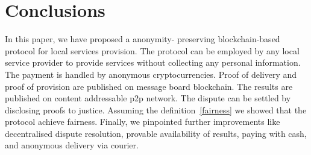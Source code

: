 \documentclass{ieeeaccess}
\begin{document}
\section{Conclusions}\label{sec:conclusion}
In this paper, we have proposed a anonymity- preserving blockchain-based protocol for local services provision. The protocol can be employed by any local service provider to provide services without collecting any personal information. The payment is handled by anonymous cryptocurrencies. Proof of delivery and proof of provision are published on message board blockchain. The results are published on content addressable p2p network. The dispute can be settled by disclosing proofs to justice. Assuming the definition~\ref{fairness} we showed that the protocol achieve fairness. Finally, we pinpointed further improvements like decentralised dispute resolution, provable  availability of results, paying with cash, and anonymous delivery via courier.



\EOD
\end{document}
